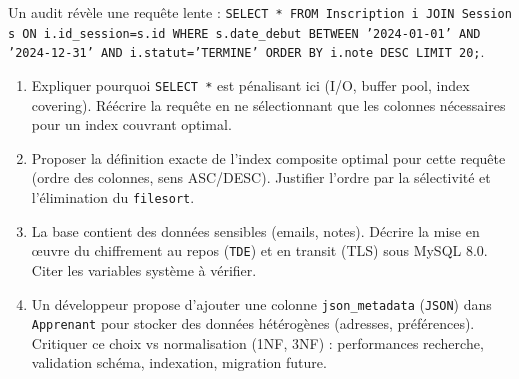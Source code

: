 \documentclass[11pt]{article}
\begin{document}
\begin{exercice}
Un audit révèle une requête lente : \texttt{SELECT * FROM Inscription i JOIN Session s ON i.id\_session=s.id WHERE s.date\_debut BETWEEN '2024-01-01' AND '2024-12-31' AND i.statut='TERMINE' ORDER BY i.note DESC LIMIT 20;}.
\begin{enumerate}
    \item Expliquer pourquoi \texttt{SELECT *} est pénalisant ici (I/O, buffer pool, index covering). Réécrire la requête en ne sélectionnant que les colonnes nécessaires pour un index couvrant optimal.
    \item Proposer la définition exacte de l'index composite optimal pour cette requête (ordre des colonnes, sens ASC/DESC). Justifier l'ordre par la sélectivité et l'élimination du \texttt{filesort}.
    \item La base contient des données sensibles (emails, notes). Décrire la mise en œuvre du chiffrement au repos (\texttt{TDE}) et en transit (TLS) sous MySQL 8.0. Citer les variables système à vérifier.
    \item Un développeur propose d'ajouter une colonne \texttt{json\_metadata} (\texttt{JSON}) dans \texttt{Apprenant} pour stocker des données hétérogènes (adresses, préférences). Critiquer ce choix vs normalisation (1NF, 3NF) : performances recherche, validation schéma, indexation, migration future.
\end{enumerate}
\end{exercice}
\end{document}
